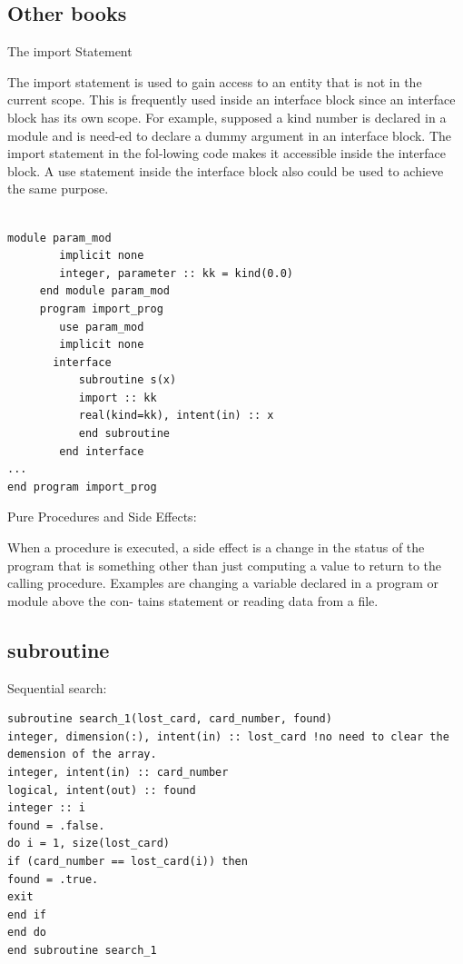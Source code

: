 \subsection{Other books}
The import Statement

The import statement is used to gain access to an entity that is not in the current scope. This is frequently used inside an interface block  since an interface block has its own scope. For example, supposed a kind number is declared in a module and is need-ed to declare a dummy argument in an interface block. The import statement in the fol-lowing code makes it accessible inside the interface block. A use statement inside the interface block also could be used to achieve the same purpose.

\begin{verbatim}

module param_mod
        implicit none
        integer, parameter :: kk = kind(0.0)
     end module param_mod
     program import_prog
        use param_mod
        implicit none
       interface
           subroutine s(x)
           import :: kk
           real(kind=kk), intent(in) :: x
           end subroutine
        end interface
...
end program import_prog
\end{verbatim}

Pure Procedures and Side Effects:

When a procedure is executed, a side effect is a change in the status of the program that is something other than just computing a value to return to the calling procedure. Examples are changing a variable declared in a program or module above the con- tains statement or reading data from a file.




\subsection{subroutine}

Sequential search:

\begin{verbatim}
subroutine search_1(lost_card, card_number, found)
integer, dimension(:), intent(in) :: lost_card !no need to clear the demension of the array.
integer, intent(in) :: card_number
logical, intent(out) :: found
integer :: i
found = .false.
do i = 1, size(lost_card)
if (card_number == lost_card(i)) then
found = .true.
exit
end if 
end do
end subroutine search_1

\end{verbatim}


